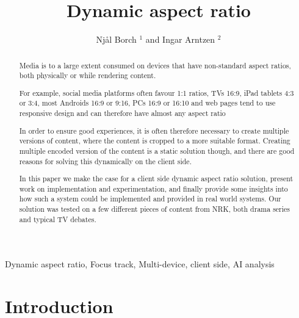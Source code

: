 \documentclass{aircc}
\title{Dynamic aspect ratio}
\author{Njål Borch $^1$ and Ingar Arntzen $^2$}
\affiliation{NORCE Norwegian Research Institute \\ $^1$\email{njbo@norceresearch.no} \\ $^2$\email{inar@norceresearch.no}}
\begin{document}
\maketitle
\pagestyle{fancy}



\begin{keywords}
Dynamic aspect ratio, Focus track, Multi-device, client side, AI analysis
\end{keywords}



 
\begin{abstract}


Media is to a large extent consumed on devices that have non-standard aspect
ratios, both physically or while rendering content. 

For example, social media platforms often favour 1:1 ratios, TVs 16:9, iPad
tablets 4:3 or 3:4, most Androids 16:9 or 9:16, PCs 16:9 or 16:10 and web
pages tend to use responsive design and can therefore have almost any aspect
ratio

In order to ensure good experiences, it is often therefore necessary to create
multiple versions of content, where the content is cropped to a more suitable
format. Creating multiple encoded version of the content is a static solution
though, and there are good reasons for solving this dynamically on the client
side. 

In this paper we make the case for a client side dynamic aspect ratio
solution, present work on implementation and experimentation, and finally
provide some insights into how such a system could be implemented and
provided in real world systems. Our solution was tested on a few different
pieces of content from NRK, both drama series and typical TV debates.

\end{abstract}


\section{Introduction}\label{introduction}
\end{document}
